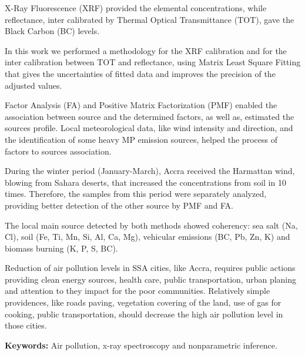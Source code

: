 X-Ray Fluorescence (XRF) provided the elemental concentrations, while 
reflectance, inter calibrated by Thermal Optical Transmittance (TOT), gave the Black 
Carbon (BC) levels. 

In this work we performed a methodology for the XRF calibration and for 
the inter calibration between TOT and reflectance, using Matrix Least Square Fitting that gives the uncertainties of 
fitted data and improves the precision of the adjusted values.

Factor Analysis (FA) and Positive Matrix Factorization (PMF) 
enabled the association between source and the determined factors, 
as well as, estimated the sources profile. Local meteorological data, like wind intensity and direction, 
and the identification of some heavy MP emission sources, 
helped the process of factors to sources association. 

During the winter period (January-March), Accra received the 
Harmattan wind, blowing from Sahara deserts, that increased
the concentrations from soil in 10 times. Therefore, the samples from 
this period were separately analyzed, providing better detection 
of the other source by PMF and FA.

The local main source detected by both methods showed coherency: 
sea salt (Na, Cl), soil (Fe, Ti, Mn, Si, Al, Ca, Mg), 
vehicular emissions (BC, Pb, Zn, K) and biomass burning (K, P, S, BC).




Reduction of air pollution levels in SSA cities, like Accra, 
requires public actions providing clean energy sources, health care, 
public transportation, urban planing and attention to they impact for 
the poor communities. Relatively simple providences, like roads paving, vegetation 
covering of the land, use of gas for cooking, public transportation, 
should decrease the high air pollution level in those cities.

\par
\vspace{1em}
\noindent\textbf{Keywords:} 
Air pollution, x-ray spectroscopy and nonparametric inference.

